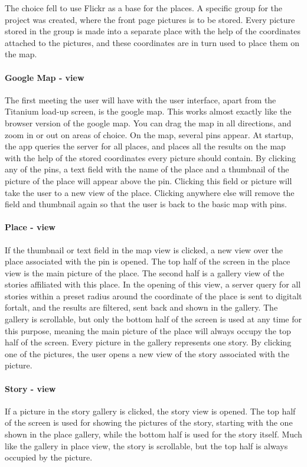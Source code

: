 \documentclass[11pt]{book}
\begin{document}
The choice fell to use Flickr as a base for the places. A specific group for the project was created, where the front page pictures is to be stored. Every picture stored in the group is made into a separate place with the help of the coordinates attached to the pictures, and these coordinates are in turn used to place them on the map.

\paragraph{Google Map - view}
The first meeting the user will have with the user interface, apart from the Titanium load-up screen, is the google map. This works almost exactly like the browser version of the google map. You can drag the map in all directions, and zoom in or out on areas of choice. On the map, several pins appear. At startup, the app queries the server for all places, and places all the results on the map with the help of the stored coordinates every picture should contain. By clicking any of the pins, a text field with the name of the place and a thumbnail of the picture of the place will appear above the pin. Clicking this field or picture will take the user to a new view of the place. Clicking anywhere else will remove the field and thumbnail again so that the user is back to the basic map with pins.

\paragraph{Place - view}
If the thumbnail or text field in the map view is clicked, a new view over the place associated with the pin is opened. The top half of the screen in the place view is the main picture of the place. The second half is a gallery view of the stories affiliated with this place. In the opening of this view, a server query for all stories within a preset radius around the coordinate of the place is sent to digitalt fortalt, and the results are filtered, sent back and shown in the gallery. The gallery is scrollable, but only the bottom half of the screen is used at any time for this purpose, meaning the main picture of the place will always occupy the top half of the screen. Every picture in the gallery represents one story. By clicking one of the pictures, the user opens a new view of the story associated with the picture.

\paragraph{Story - view}
If a picture in the story gallery is clicked, the story view is opened. The top half of the screen is used for showing the pictures of the story, starting with the one shown in the place gallery, while the bottom half is used for the story itself. Much like the gallery in place view, the story is scrollable, but the top half is always occupied by the picture.
\end{document}
